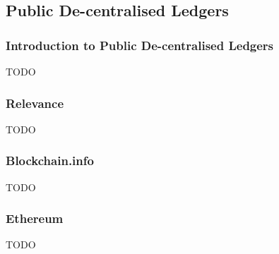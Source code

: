\subsection{Public De-centralised Ledgers}

\subsubsection{Introduction to Public De-centralised Ledgers}

TODO

\subsubsection{Relevance}

TODO





\subsubsection{Blockchain.info}

TODO

\subsubsection{Ethereum}

TODO
